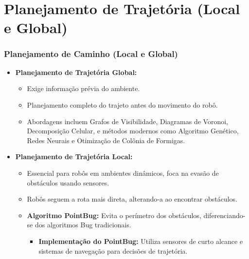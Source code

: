 \documentclass[xcolor=dvipsnames, aspectratio=169]{beamer}
\begin{document}
\section{Planejamento de Trajetória (Local e Global)}
\begin{frame}[fragile]
  \frametitle{Planejamento de Caminho (Local e Global)}
  \begin{itemize}
    \item \textbf{Planejamento de Trajetória Global:} 
    \begin{itemize}
        \item Exige informação prévia do ambiente.
        \item Planejamento completo do trajeto antes do movimento do robô.
        \item Abordagens incluem Grafos de Visibilidade, Diagramas de Voronoi, Decomposição Celular, e métodos modernos como Algoritmo Genético, Redes Neurais e Otimização de Colônia de Formigas.
    \end{itemize}
    \item \textbf{Planejamento de Trajetória Local:}
    \begin{itemize}
      \item Essencial para robôs em ambientes dinâmicos, foca na evasão de obstáculos usando sensores.
      \item Robôs seguem a rota mais direta, alterando-a ao encontrar obstáculos.
      \item \textbf{Algoritmo PointBug:} Evita o perímetro dos obstáculos, diferenciando-se dos algoritmos Bug tradicionais.
      \begin{itemize}
        \item \textbf{Implementação do PointBug:} Utiliza sensores de curto alcance e sistemas de navegação para decisões de trajetória.
      \end{itemize}
    \end{itemize}
  \end{itemize}

\end{frame}

\end{document}
